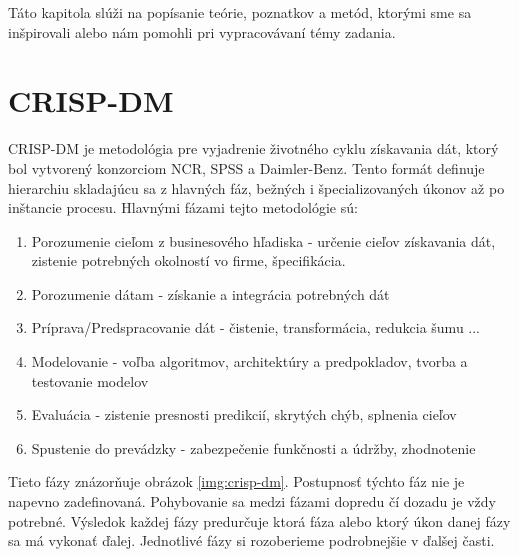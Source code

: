 Táto kapitola slúži na popísanie teórie, poznatkov a metód, ktorými sme sa inšpirovali alebo nám pomohli pri vypracovávaní témy zadania.
\section{CRISP-DM}
CRISP-DM je metodológia pre vyjadrenie životného cyklu získavania dát, ktorý bol vytvorený konzorciom NCR, SPSS a Daimler-Benz. Tento formát definuje hierarchiu skladajúcu sa z hlavných fáz, bežných i špecializovaných úkonov až po inštancie procesu. Hlavnými fázami tejto metodológie sú:\par
\begin{enumerate}
  \item Porozumenie cieľom z businesového hľadiska - určenie cieľov získavania dát, zistenie potrebných okolností vo firme, špecifikácia.
  \item Porozumenie dátam - získanie a integrácia potrebných dát
  \item Príprava/Predspracovanie dát - čistenie, transformácia, redukcia šumu ...
  \item Modelovanie - voľba algoritmov, architektúry a predpokladov, tvorba a testovanie modelov
  \item Evaluácia - zistenie presnosti predikcií, skrytých chýb, splnenia cieľov
  \item Spustenie do prevádzky - zabezpečenie funkčnosti a údržby, zhodnotenie
\end{enumerate}
Tieto fázy znázorňuje obrázok \ref{img:crisp-dm}. Postupnosť týchto fáz nie je napevno zadefinovaná. Pohybovanie sa medzi fázami dopredu čí dozadu je vždy potrebné. Výsledok každej fázy predurčuje ktorá fáza alebo ktorý úkon danej fázy sa má vykonať ďalej. Jednotlivé fázy si rozoberieme podrobnejšie v ďalšej časti.
